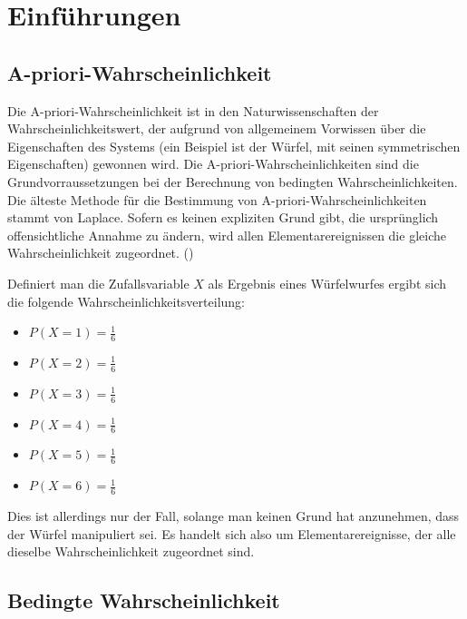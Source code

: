 
\chapter{Einführungen}

\section{A-priori-Wahrscheinlichkeit}

Die A-priori-Wahrscheinlichkeit ist in den Naturwissenschaften der Wahrscheinlichkeitswert, der aufgrund von allgemeinem Vorwissen über die Eigenschaften des Systems
(ein Beispiel ist der Würfel, mit seinen symmetrischen Eigenschaften) gewonnen wird. Die A-priori-Wahrscheinlichkeiten sind die Grundvorraussetzungen
bei der Berechnung von bedingten Wahrscheinlichkeiten.
Die älteste Methode für die Bestimmung von A-priori-Wahrscheinlichkeiten stammt von Laplace. Sofern es keinen expliziten Grund gibt, die ursprünglich
offensichtliche Annahme zu ändern, wird allen Elementarereignissen die gleiche Wahrscheinlichkeit zugeordnet. (\cite[S. 80f]{Pap:1995})

Definiert man die Zufallsvariable $X$ als Ergebnis eines Würfelwurfes ergibt sich die folgende Wahrscheinlichkeitsverteilung:

\begin{multicols}{3}
    \begin{itemize}
        \item $P(X = 1) = \frac{1}{6}$
        \item $P(X = 2) = \frac{1}{6}$
        \item $P(X = 3) = \frac{1}{6}$
        \item $P(X = 4) = \frac{1}{6}$
        \item $P(X = 5) = \frac{1}{6}$
        \item $P(X = 6) = \frac{1}{6}$
    \end{itemize}
\end{multicols}

Dies ist allerdings nur der Fall, solange man keinen Grund hat anzunehmen, dass der Würfel manipuliert sei. Es handelt sich also um Elementarereignisse, der
alle dieselbe Wahrscheinlichkeit zugeordnet sind.

\section{Bedingte Wahrscheinlichkeit}

